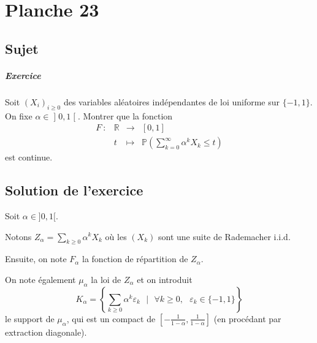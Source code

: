 \chapter{Planche 23}

\section{Sujet}

\paragraph{Exercice}
Soit $(X_i)_{i\geqslant 0}$ des variables aléatoires indépendantes de loi uniforme sur $\{-1,1\}$. On fixe $\alpha \in \mathopen]0,1\mathclose[$.
Montrer que la fonction
\[
\begin{array}{cccc}
F \ :  &\mathbb R & \longrightarrow & [0,1]\\
& t & \longmapsto & \displaystyle\mathbb P\left(\sum_{k=0}^\infty \alpha^k X_k \leqslant t\right)
\end{array}
\]
est continue.


\section{Solution de l'exercice}

Soit $\alpha\in]0,1[.$

Notons $\displaystyle Z_{\alpha}=\sum_{k\geq 0}\alpha^{k}X_{k}$ où les $(X_{k})$ sont une suite de Rademacher i.i.d.

Ensuite, on note $\displaystyle F_{\alpha}$ la fonction de répartition de $Z_{\alpha}.$

On note également $\mu_{\alpha}$ la loi de $Z_{\alpha}$ et on introduit $$K_{\alpha}=\left\{ \sum_{k\geq 0}\alpha^{k}\varepsilon_{k}\mbox{ }|\mbox{ } \forall k\geq 0,\mbox{ } \varepsilon_{k}\in\{-1,1\}  \right\}$$ le support de $\mu_{\alpha}$, qui est un compact de $\displaystyle [-\frac{1}{1-\alpha},\frac{1}{1-\alpha}]$ (en procédant par extraction diagonale).

